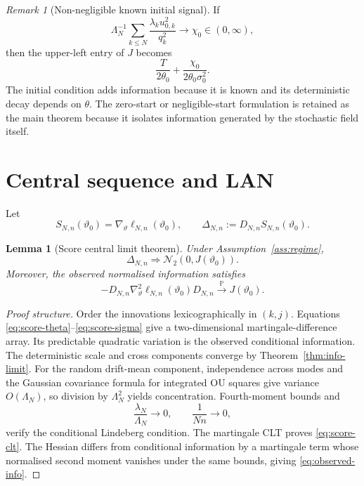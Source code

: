 \documentclass[11pt]{article}
\newtheorem{lemma}[assumption]{Lemma}
\theoremstyle{remark}
\newtheorem{remark}[assumption]{Remark}
\newcommand{\Pp}{\mathbb P}
\newcommand{\1}{\mathbf 1}
\newcommand{\elln}{\ell_{N,n}}
\newcommand{\LamN}{\Lambda_N}
\newcommand{\Dn}{D_{N,n}}
\newcommand{\vzero}{\vartheta_0}
\begin{document}
\begin{remark}[Non-negligible known initial signal]\label{rem:initial}
If
\[
 \LamN^{-1}\sum_{k\le N}\frac{\lambda_ku_{0,k}^2}{q_k^2}
 \longrightarrow\chi_0\in(0,\infty),
\]
then the upper-left entry of $J$ becomes
\[
 \frac{T}{2\theta_0}
 +\frac{\chi_0}{2\theta_0\sigma_0^2}.
\]
The initial condition adds information because it is known and its deterministic decay depends on $\theta$.  The zero-start or negligible-start formulation is retained as the main theorem because it isolates information generated by the stochastic field itself.
\end{remark}

\section{Central sequence and LAN}

Let
\[
 S_{N,n}(\vzero)=\nabla_\vartheta\elln(\vzero),
 \qquad
 \Delta_{N,n}:=\Dn S_{N,n}(\vzero).
\]

\begin{lemma}[Score central limit theorem]\label{lem:score-clt}
Under Assumption~\ref{ass:regime},
\begin{equation}\label{eq:score-clt}
 \Delta_{N,n}\Rightarrow\mathcal N_2(0,J(\vzero)).
\end{equation}
Moreover, the observed normalised information satisfies
\begin{equation}\label{eq:observed-info}
 -\Dn\nabla_\vartheta^2\elln(\vzero)\Dn
 \overset{\Pp}{\longrightarrow}J(\vzero).
\end{equation}
\end{lemma}

\begin{proof}[Proof structure]
Order the innovations lexicographically in $(k,j)$.  Equations \eqref{eq:score-theta}--\eqref{eq:score-sigma} give a two-dimensional martingale-difference array.  Its predictable quadratic variation is the observed conditional information.  The deterministic scale and cross components converge by Theorem~\ref{thm:info-limit}.  For the random drift-mean component, independence across modes and the Gaussian covariance formula for integrated OU squares give variance $O(\LamN)$, so division by $\LamN^2$ yields concentration.  Fourth-moment bounds and
\[
 \frac{\lambda_N}{\LamN}\to0,
 \qquad
 \frac1{Nn}\to0,
\]
verify the conditional Lindeberg condition.  The martingale CLT proves \eqref{eq:score-clt}.  The Hessian differs from conditional information by a martingale term whose normalised second moment vanishes under the same bounds, giving \eqref{eq:observed-info}.
\end{proof}
\end{document}

